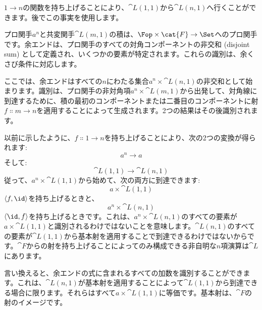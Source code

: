 \begin{figure}[H]
  \centering
\end{figure}

$1 \to n$の関数を持ち上げることにより、$\cat{L}(1, 1)$から$\cat{L}(n, 1)$へ行くことができます。後でこの事実を使用します。

プロ関手$a^n$と共変関手$\cat{L}(m, 1)$の積は、$\Fop \times \cat{F} \to \Set$へのプロ関手です。余エンドは、プロ関手のすべての対角コンポーネントの非交和 (disjoint sum) として定義され、いくつかの要素が特定されます。これらの識別は、余くさび条件に対応します。

ここでは、余エンドはすべての$n$にわたる集合$a^n \times \cat{L}(n, 1)$の非交和として始まります。識別は、プロ関手の非対角項$a^n \times \cat{L}(m, 1)$から出発して、対角線に到達するために、積の最初のコンポーネントまたは二番目のコンポーネントに射$f \Colon m \to n$を適用することによって生成されます。2つの結果はその後識別されます。

\begin{figure}[H]
  \centering
\end{figure}

以前に示したように、$f \Colon 1 \to n$を持ち上げることにより、次の2つの変換が得られます: 
\[a^n \to a\]
そして: 
\[\cat{L}(1, 1) \to \cat{L}(n, 1)\]
従って、$a^n \times \cat{L}(1, 1)$から始めて、次の両方に到達できます: 
\[a \times \cat{L}(1, 1)\]
$\langle f, \id \rangle$を持ち上げるときと、
\[a^n \times \cat{L}(n, 1)\]
$\langle \id, f \rangle$を持ち上げるときです。これは、$a^n \times \cat{L}(n, 1)$のすべての要素が$a \times \cat{L}(1, 1)$と識別されるわけではないことを意味します。$\cat{L}(n, 1)$のすべての要素が$\cat{L}(1, 1)$から基本射を適用することで到達できるわけではないからです。$\cat{F}$からの射を持ち上げることによってのみ構成できる非自明な$n$項演算は$\cat{L}$にあります。

言い換えると、余エンドの式に含まれるすべての加数を識別することができます。これは、$\cat{L}(n, 1)$が基本射を適用することによって$\cat{L}(1, 1)$から到達できる場合に限ります。それらはすべて$a \times \cat{L}(1, 1)$に等価です。基本射は、$\cat{F}$の射のイメージです。


